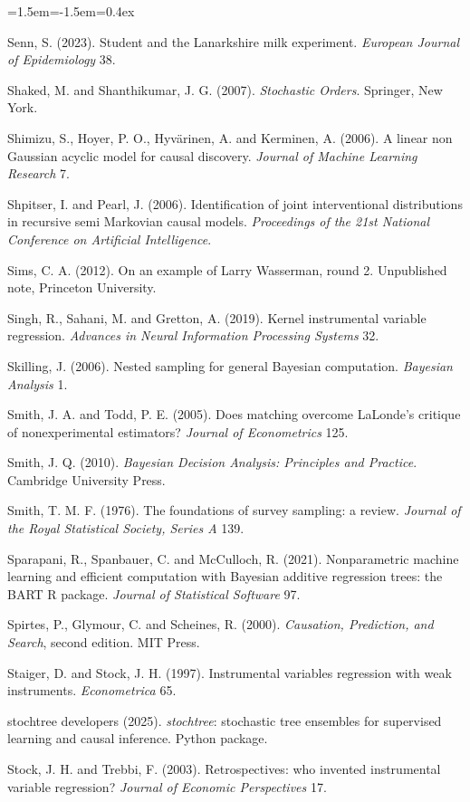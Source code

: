 \begin{list}{}{\leftmargin=1.5em\itemindent=-1.5em\itemsep=0.4ex}
\item Senn, S. (2023). Student and the Lanarkshire milk experiment. \emph{European Journal of Epidemiology} 38.
\item Shaked, M. and Shanthikumar, J. G. (2007). \emph{Stochastic Orders}. Springer, New York.
\item Shimizu, S., Hoyer, P. O., Hyv\"arinen, A. and Kerminen, A. (2006). A linear non Gaussian acyclic model for causal discovery. \emph{Journal of Machine Learning Research} 7.
\item Shpitser, I. and Pearl, J. (2006). Identification of joint interventional distributions in recursive semi Markovian causal models. \emph{Proceedings of the 21st National Conference on Artificial Intelligence}.
\item Sims, C. A. (2012). On an example of Larry Wasserman, round 2. Unpublished note, Princeton University.
\item Singh, R., Sahani, M. and Gretton, A. (2019). Kernel instrumental variable regression. \emph{Advances in Neural Information Processing Systems} 32.
\item Skilling, J. (2006). Nested sampling for general Bayesian computation. \emph{Bayesian Analysis} 1.
\item Smith, J. A. and Todd, P. E. (2005). Does matching overcome LaLonde's critique of nonexperimental estimators? \emph{Journal of Econometrics} 125.
\item Smith, J. Q. (2010). \emph{Bayesian Decision Analysis: Principles and Practice}. Cambridge University Press.
\item Smith, T. M. F. (1976). The foundations of survey sampling: a review. \emph{Journal of the Royal Statistical Society, Series A} 139.
\item Sparapani, R., Spanbauer, C. and McCulloch, R. (2021). Nonparametric machine learning and efficient computation with Bayesian additive regression trees: the BART R package. \emph{Journal of Statistical Software} 97.
\item Spirtes, P., Glymour, C. and Scheines, R. (2000). \emph{Causation, Prediction, and Search}, second edition. MIT Press.
\item Staiger, D. and Stock, J. H. (1997). Instrumental variables regression with weak instruments. \emph{Econometrica} 65.
\item stochtree developers (2025). \emph{stochtree}: stochastic tree ensembles for supervised learning and causal inference. Python package.
\item Stock, J. H. and Trebbi, F. (2003). Retrospectives: who invented instrumental variable regression? \emph{Journal of Economic Perspectives} 17.

\end{list}
